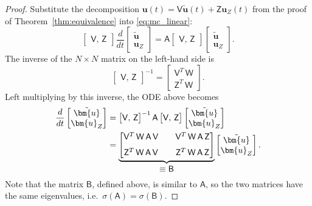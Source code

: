 \documentclass[pdflatex,sn-mathphys-num]{sn-jnl}%
\theoremstyle{thmstyleone}%
\theoremstyle{thmstyletwo}%
\theoremstyle{thmstylethree}%
\newcommand{\mat}[1]{\ensuremath{\mathsf{#1}}}
\begin{document}
\begin{proof}
Substitute the decomposition $\bm{u}(t) = \mat{V} \tilde{\bm{u}}(t) + \mat{Z} \bm{u}_Z(t)$ from the proof of Theorem~\ref{thm:equivalence} into \eqref{eq:mc_linear}:
\begin{equation*}
   \begin{bmatrix} \mat{V},\, \mat{Z} \end{bmatrix} \frac{d}{dt} \begin{bmatrix} \tilde{\bm{u}} \\ \bm{u}_Z \end{bmatrix}
    = \mat{A} \begin{bmatrix} \mat{V},\, \mat{Z} \end{bmatrix} \begin{bmatrix} \tilde{\bm{u}} \\ \bm{u}_Z \end{bmatrix}.
\end{equation*}
The inverse of the $N \times N$ matrix on the left-hand side is
\begin{equation*}
    \begin{bmatrix} \mat{V},\, \mat{Z} \end{bmatrix}^{-1}
    = \begin{bmatrix} \mat{V}^T\, \mat{W} \\ \mat{Z}^T\, \mat{W} \end{bmatrix}.
\end{equation*}
Left multiplying by this inverse, the ODE above becomes
\begin{align}
\frac{d}{dt} \begin{bmatrix} \tilde{\bm{u}} \\ \bm{u}_Z \end{bmatrix}
    &= \begin{bmatrix} \mat{V},\, \mat{Z} \end{bmatrix}^{-1} \mat{A} \begin{bmatrix} \mat{V},\, \mat{Z} \end{bmatrix} \begin{bmatrix} \tilde{\bm{u}} \\ \bm{u}_Z \end{bmatrix} \notag \\
    &= \underbrace{\begin{bmatrix} \mat{V}^T \,\mat{W}\, \mat{A}\, \mat{V} \quad & \mat{V}^T\, \mat{W}\, \mat{A}\, \mat{Z} \\[1.5ex] \mat{Z}^T\, \mat{W}\, \mat{A}\, \mat{V}\quad & \mat{Z}^T \,\mat{W}\, \mat{A}\, \mat{Z} \end{bmatrix}}_{\displaystyle \equiv \mat{B} } \begin{bmatrix} \tilde{\bm{u}} \\ \bm{u}_Z \end{bmatrix}. \label{eq:B}
\end{align}
Note that the matrix $\mat{B}$, defined above, is similar to $\mat{A}$, so the two matrices have the same eigenvalues, i.e.~$\sigma(\mat{A}) = \sigma(\mat{B})$.


\end{proof}
\end{document}
